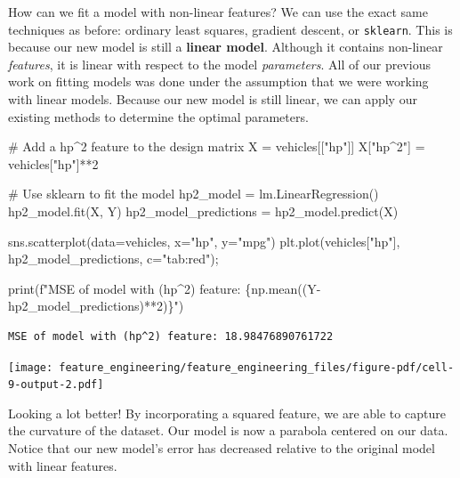 \documentclass[
  letterpaper,
  DIV=11,
  numbers=noendperiod]{scrreprt}
\newenvironment{Shaded}{\begin{snugshade}}{\end{snugshade}}
\newcommand{\BuiltInTok}[1]{\textcolor[rgb]{0.00,0.23,0.31}{#1}}
\newcommand{\CommentTok}[1]{\textcolor[rgb]{0.37,0.37,0.37}{#1}}
\newcommand{\DecValTok}[1]{\textcolor[rgb]{0.68,0.00,0.00}{#1}}
\newcommand{\NormalTok}[1]{\textcolor[rgb]{0.00,0.23,0.31}{#1}}
\newcommand{\OperatorTok}[1]{\textcolor[rgb]{0.37,0.37,0.37}{#1}}
\newcommand{\SpecialCharTok}[1]{\textcolor[rgb]{0.37,0.37,0.37}{#1}}
\newcommand{\SpecialStringTok}[1]{\textcolor[rgb]{0.13,0.47,0.30}{#1}}
\newcommand{\StringTok}[1]{\textcolor[rgb]{0.13,0.47,0.30}{#1}}
\begin{document}
How can we fit a model with non-linear features? We can use the exact
same techniques as before: ordinary least squares, gradient descent, or
\texttt{sklearn}. This is because our new model is still a
\textbf{linear model}. Although it contains non-linear \emph{features},
it is linear with respect to the model \emph{parameters}. All of our
previous work on fitting models was done under the assumption that we
were working with linear models. Because our new model is still linear,
we can apply our existing methods to determine the optimal parameters.

\begin{Shaded}
\begin{Highlighting}[]
\CommentTok{\# Add a hp\^{}2 feature to the design matrix}
\NormalTok{X }\OperatorTok{=}\NormalTok{ vehicles[[}\StringTok{"hp"}\NormalTok{]]}
\NormalTok{X[}\StringTok{"hp\^{}2"}\NormalTok{] }\OperatorTok{=}\NormalTok{ vehicles[}\StringTok{"hp"}\NormalTok{]}\OperatorTok{**}\DecValTok{2}

\CommentTok{\# Use sklearn to fit the model}
\NormalTok{hp2\_model }\OperatorTok{=}\NormalTok{ lm.LinearRegression()}
\NormalTok{hp2\_model.fit(X, Y)}
\NormalTok{hp2\_model\_predictions }\OperatorTok{=}\NormalTok{ hp2\_model.predict(X)}

\NormalTok{sns.scatterplot(data}\OperatorTok{=}\NormalTok{vehicles, x}\OperatorTok{=}\StringTok{"hp"}\NormalTok{, y}\OperatorTok{=}\StringTok{"mpg"}\NormalTok{)}
\NormalTok{plt.plot(vehicles[}\StringTok{"hp"}\NormalTok{], hp2\_model\_predictions, c}\OperatorTok{=}\StringTok{"tab:red"}\NormalTok{)}\OperatorTok{;}

\BuiltInTok{print}\NormalTok{(}\SpecialStringTok{f"MSE of model with (hp\^{}2) feature: }\SpecialCharTok{\{}\NormalTok{np}\SpecialCharTok{.}\NormalTok{mean((Y}\OperatorTok{{-}}\NormalTok{hp2\_model\_predictions)}\OperatorTok{**}\DecValTok{2}\NormalTok{)}\SpecialCharTok{\}}\SpecialStringTok{"}\NormalTok{)}
\end{Highlighting}
\end{Shaded}

\begin{verbatim}
MSE of model with (hp^2) feature: 18.98476890761722
\end{verbatim}

\texttt{[image: feature\_engineering/feature\_engineering\_files/figure-pdf/cell-9-output-2.pdf]}

Looking a lot better! By incorporating a squared feature, we are able to
capture the curvature of the dataset. Our model is now a parabola
centered on our data. Notice that our new model's error has decreased
relative to the original model with linear features.
\end{document}
